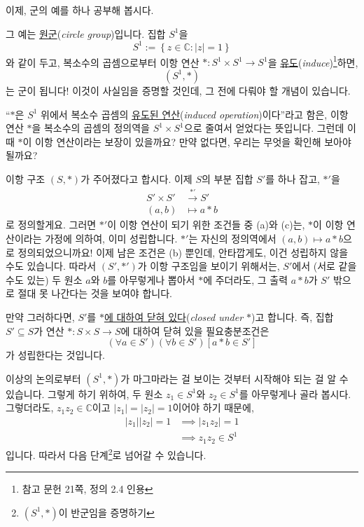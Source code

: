 \documentclass[12pt]{paper}
\begin{document}
  이제, 군의 예를 하나 공부해 봅시다.

  그 예는 \underline{원군}(\textit{circle group})입니다.
  집합 $S^1$을
  \begin{equation*}
    S^1 := \left\{ z \in \mathbb{C} : \left| z \right| = 1 \right\} \tag{5}
  \end{equation*}
  와 같이 두고,
  복소수의 곱셈으로부터 이항 연산 $* : S^1 \times S^1 \to S^1$을 \underline{유도}(\textit{induce})\footnote{참고 문헌 \cite{fraleigh2009} 21쪽, 정의 2.4 인용}하면,
  $$\left( S^1 , * \right)$$는 군이 됩니다!
  이것이 사실임을 증명할 것인데, 그 전에 다뤄야 할 개념이 있습니다.

  ``$*$은 $S^1$ 위에서 복소수 곱셈의 \underline{유도된 연산}(\textit{induced operation})이다''라고 함은,
  이항 연산 $*$을 복소수의 곱셈의 정의역을 $S^1 \times S^1$으로 줄여서 얻었다는 뜻입니다.
  그런데 이때 $*$이 이항 연산이라는 보장이 있을까요?
  만약 없다면, 우리는 무엇을 확인해 보아야 될까요?

  이항 구조 $\left( S , * \right)$가 주어졌다고 합시다.
  이제 $S$의 부분 집합 $S'$를 하나 잡고, $*'$을
  \begin{align*}
    S' \times S' & \xrightarrow{*'} S' \\
    \left( a , b \right) & \mapsto a * b
  \end{align*}
  로 정의할게요.
  그러면 $*'$이 이항 연산이 되기 위한 조건들 중 (a)와 (c)는, $*$이 이항 연산이라는 가정에 의하여, 이미 성립합니다.
  $*'$는 자신의 정의역에서 $ \left( a , b \right) \mapsto a * b $으로 정의되었으니까요!
  이제 남은 조건은 (b) 뿐인데, 안타깝게도, 이건 성립하지 않을 수도 있습니다.
  따라서 $\left( S' , *' \right)$가 이항 구조임을 보이기 위해서는,
  $S'$에서 (서로 같을 수도 있는) 두 원소 $a$와 $b$를 아무렇게나 뽑아서 $*$에 주더라도,
  그 출력 $a * b$가 $S'$ 밖으로 절대 못 나간다는 것을 보여야 합니다.

  만약 그러하다면, $S'$를 \underline{$*$에 대하여 닫혀 있다}(\textit{closed under $*$})고 합니다.
  즉, 집합 $S' \subseteq S$가 연산 $* : S \times S \to S$에 대하여 닫혀 있을 필요충분조건은
  $$ \left( \forall a \in S' \right) \left( \forall b \in S' \right) \left[ a * b \in S' \right] $$
  가 성립한다는 것입니다.

  이상의 논의로부터 $\left( S^1 , * \right)$가 마그마라는 걸 보이는 것부터 시작해야 되는 걸 알 수 있습니다.
  그렇게 하기 위하여, 두 원소 $z_1 \in S^1$와 $z_2 \in S^1$를 아무렇게나 골라 봅시다.
  그렇더라도, $ z_1 z_2 \in \mathbb{C} $이고 $\left| z_1 \right| = \left| z_2 \right| = 1$이어야 하기 때문에,
  \begin{align*}
    \left| z_1 \right| \left| z_2 \right| = 1
    & \implies \left| z_1 z_2 \right| = 1 \\
    & \implies z_1 z_2 \in S^1
  \end{align*}
  입니다.
  따라서 다음 단계\footnote{$\left( S^1 , * \right)$이 반군임을 증명하기}로 넘어갈 수 있습니다.
\end{document}
